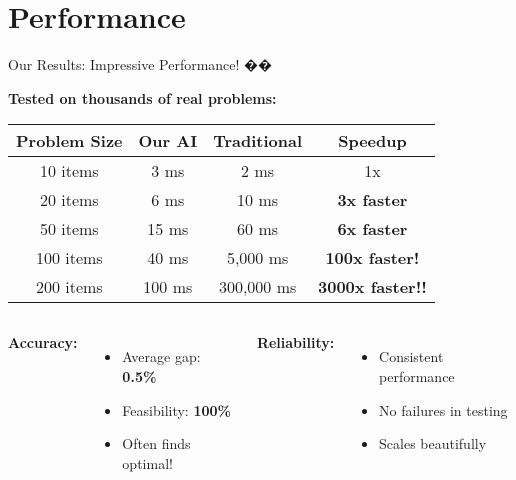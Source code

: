 \documentclass[aspectratio=169]{beamer}
\begin{document}

\section{Performance}

\begin{frame}{Our Results: Impressive Performance! ��}
\begin{center}
\textbf{Tested on thousands of real problems:}
\end{center}

\vspace{0.3cm}

\begin{table}
\centering
\begin{tabular}{|c|c|c|c|}
\hline
\textbf{Problem Size} & \textbf{Our AI} & \textbf{Traditional} & \textbf{Speedup} \\
\hline
10 items & 3 ms & 2 ms & 1x \\
\hline
20 items & 6 ms & 10 ms & \textcolor{aigreen}{\textbf{3x faster}} \\
\hline
50 items & 15 ms & 60 ms & \textcolor{aigreen}{\textbf{6x faster}} \\
\hline
100 items & 40 ms & 5,000 ms & \textcolor{aigreen}{\textbf{100x faster!}} \\
\hline
200 items & 100 ms & 300,000 ms & \textcolor{aigreen}{\textbf{3000x faster!!}} \\
\hline
\end{tabular}
\end{table}

\vspace{0.3cm}

\begin{columns}
\textbf{Accuracy:}
\begin{itemize}
    \item Average gap: \textcolor{aigreen}{\textbf{0.5\%}}
    \item Feasibility: \textcolor{aigreen}{\textbf{100\%}}
    \item Often finds optimal!
\end{itemize}

\textbf{Reliability:}
\begin{itemize}
    \item Consistent performance
    \item No failures in testing
    \item Scales beautifully
\end{itemize}
\end{columns}
\end{frame}
\end{document}
